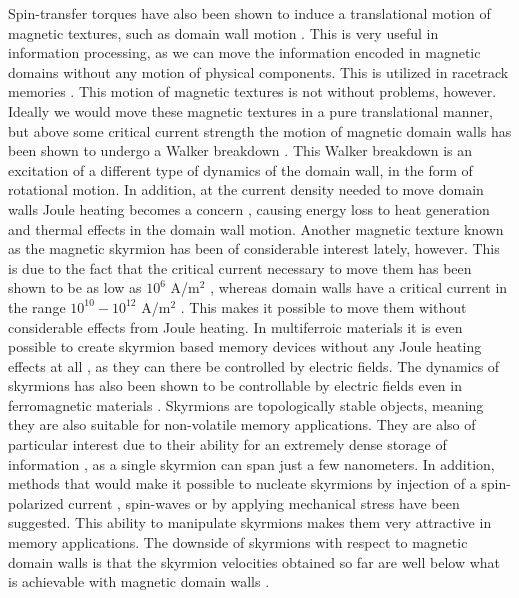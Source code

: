 Spin-transfer torques have also been shown to induce a translational motion of magnetic textures, such as domain wall motion \cite{Gan2000,Vernier2004}. This is very useful in information processing, as we can move the information encoded in magnetic domains without any motion of physical components. This is utilized in racetrack memories \cite{Parkin2008}. This motion of magnetic textures is not without problems, however. Ideally we would move these magnetic textures in a pure translational manner, but above some critical current strength the motion of magnetic domain walls has been shown to undergo a Walker breakdown \cite{SchryerWalker1974}. This Walker breakdown is an excitation of a different type of dynamics of the domain wall, in the form of rotational motion. In addition, at the current density needed to move domain walls Joule heating becomes a concern \cite{Yamaguchi2005}, causing energy loss to heat generation and thermal effects in the domain wall motion. Another magnetic texture known as the magnetic skyrmion has been of considerable interest lately, however. This is due to the fact that the critical current necessary to move them has been shown to be as low as $10^6$ A/m$^2$ \cite{Jonietz2010,Schulz2012,Yu2012}, whereas domain walls have a critical current in the range $10^{10}-10^{12}$ A/m$^2$ \cite{Grollier2003,Parkin2008}. This makes it possible to move them without considerable effects from Joule heating. In multiferroic materials it is even possible to create skyrmion based memory devices without any Joule heating effects at all \cite{Mochizuki2015}, as they can there be controlled by electric fields. The dynamics of skyrmions has also been shown to be controllable by electric fields even in ferromagnetic materials \cite{Upadhyaya2015}.  Skyrmions are topologically stable objects, meaning  they are also suitable for non-volatile memory applications. They are also of particular interest due to their ability for an extremely dense storage of information \cite{Fert2013}, as a single skyrmion can span just a few nanometers. In addition, methods that would make it possible to nucleate skyrmions by injection of a spin-polarized current \cite{Sampaio2013}, spin-waves \cite{Liu2015} or by applying mechanical stress \cite{Nii2015} have been suggested. This ability to manipulate skyrmions makes them very attractive in memory applications. The downside of skyrmions with respect to magnetic domain walls is that the skyrmion velocities obtained so far are well below what is achievable with magnetic domain walls \cite{Fert2013,Yang2015}. 

